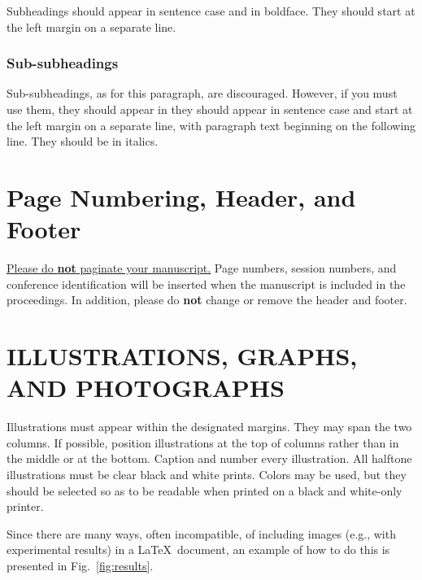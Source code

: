 \documentclass[a4paper,10pt,oneside]{article}
\begin{document}
\begin{sloppy}
Subheadings should appear in sentence case and in boldface. They should start at the left margin on a separate line. 
 
\subsubsection{Sub-subheadings}
\label{sssec:subsubhead}

Sub-subheadings, as for this paragraph, are discouraged. However, if you must use them, they should appear in they should appear in sentence case and start at the left margin on a separate line, with paragraph text beginning on the following line. They should be in italics.  \\

\section{Page Numbering, Header, and Footer}
\label{sec:page}

\underline{Please do {\bf not} paginate your manuscript.} Page numbers, session numbers, and conference identification will be inserted when the manuscript is included in the proceedings. In addition, please do {\bf not} change or remove the header and footer.

\section{ILLUSTRATIONS, GRAPHS, AND PHOTOGRAPHS}
\label{sec:illust}

Illustrations must appear within the designated margins. They may span the two columns. If possible, position illustrations at the top of columns rather than in the middle or at the bottom. Caption and number every illustration. All halftone illustrations must be clear black and white prints. Colors may be used, but they should be selected so as to be readable when printed on a black and white-only printer.

Since there are many ways, often incompatible, of including images (e.g., with experimental results) in a \LaTeX ~document, an example of how to do this is presented in Fig.~\ref{fig:results}.




\end{sloppy}
\end{document}
